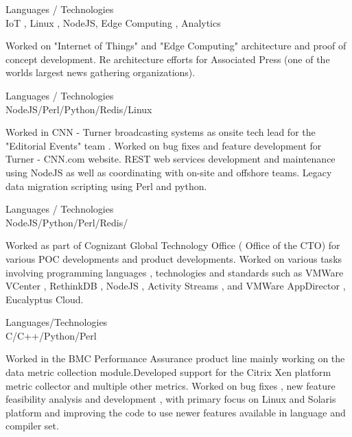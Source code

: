 \documentclass[a4,11pt]{cv4tw}
\begin{document}
{Languages / Technologies \\ IoT , Linux , NodeJS, Edge Computing , Analytics }
	{ 
	\begin{missions}
		\item Worked on "Internet of Things" and "Edge Computing" architecture and proof of concept development.  Re architecture efforts for Associated Press (one of the worlds largest news gathering organizations). 
	\end{missions}
}

{Languages / Technologies \\ NodeJS/Perl/Python/Redis/Linux}
	{ 
	\begin{missions}
		\item Worked in CNN - Turner broadcasting systems as onsite tech lead for the "Editorial Events" team . Worked on bug fixes and feature development for Turner - CNN.com website. REST web services development and maintenance using NodeJS as well as coordinating with on-site and offshore teams. Legacy data migration scripting using Perl and python.
	\end{missions}
}

{Languages / Technologies \\ NodeJS/Python/Perl/Redis/}
	{ 
	\begin{missions}
	    \item Worked as part of Cognizant Global Technology Office ( Office of the CTO) for various POC developments and product developments. Worked on various tasks involving programming languages , technologies and standards such as VMWare VCenter , RethinkDB , NodeJS , Activity Streams , and VMWare AppDirector , Eucalyptus Cloud.
	\end{missions}
}

{Languages/Technologies \\ C/C++/Python/Perl}
	{ 
	\begin{missions}	
		\item Worked  in the BMC Performance Assurance product line mainly working on the data metric collection module.Developed support for the Citrix Xen platform metric collector and multiple other metrics. Worked  on bug fixes , new feature feasibility analysis and development , with primary focus on Linux and Solaris platform and improving the code to use newer features available in language and compiler set.
	\end{missions}
}
\end{document}
